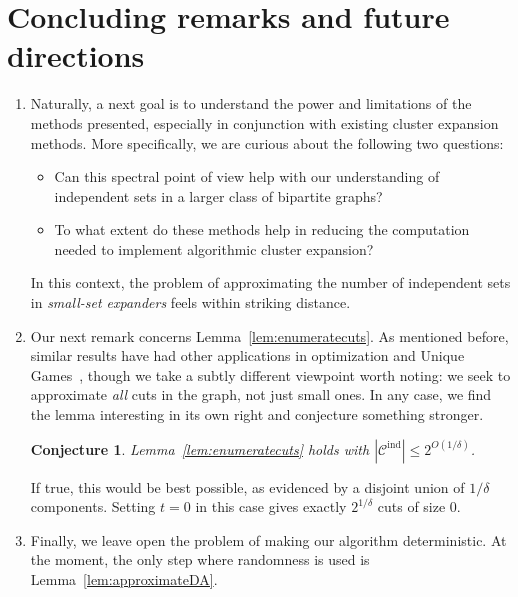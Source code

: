 \documentclass[11pt,letterpaper]{amsart}
\newtheorem{conjecture}[theorem]{Conjecture}
\theoremstyle{definition}
\newcommand*{\Cind}{\mathcal{C}^{\mathrm{ind}}}
\begin{document}
\section{Concluding remarks and future directions}
\begin{enumerate}[wide, labelwidth=!, labelindent=0pt]
\item[1.] Naturally, a next goal is to understand the power and limitations of the methods presented, especially in conjunction with existing cluster expansion methods. More specifically, we are curious about the following two questions: 
\begin{itemize}
\item[i.] Can this spectral point of view help with our understanding of independent sets in a larger class of bipartite graphs?
\item[ii.] To what extent do these methods help in reducing the computation needed to implement algorithmic cluster expansion? 
\end{itemize}
In this context, the problem of approximating the number of independent sets in \emph{small-set expanders} feels within striking distance.\\
\item[2.] Our next remark concerns Lemma~\ref{lem:enumeratecuts}. As mentioned before, similar results have had other applications in optimization and Unique Games~\cite{ABS10,Kol10,KT07}, though we take a subtly different viewpoint worth noting: we seek to approximate \emph{all} cuts in the graph, not just small ones. In any case, we find the lemma interesting in its own right and conjecture something stronger.
\begin{conjecture} Lemma~\ref{lem:enumeratecuts} holds with $|\Cind| \leq 2^{O(1/\delta)}$.
\end{conjecture}
If true, this would be best possible, as evidenced by a disjoint union of $1/\delta$ components. Setting $t = 0$ in this case gives exactly $2^{1/\delta}$ cuts of size $0$.\\
\item[3.] Finally, we leave open the problem of making our algorithm deterministic. At the moment, the only step where randomness is used is Lemma~\ref{lem:approximateDA}. 
\end{enumerate}
\end{document}
